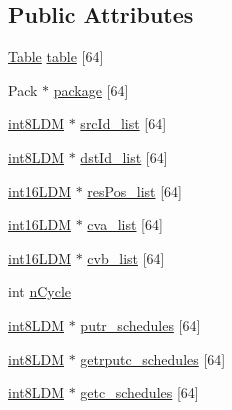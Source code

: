 \subsection*{Public Attributes}
\begin{DoxyCompactItemize}
\item 
\mbox{\hyperlink{structTable}{Table}} \mbox{\hyperlink{structRlmpiInfo_a220265259db4003f306b9a0fbeec5c53}{table}} \mbox{[}64\mbox{]}
\item 
Pack $\ast$ \mbox{\hyperlink{structRlmpiInfo_a6d32f232ba6595d5748ec3a79ea6d1cc}{package}} \mbox{[}64\mbox{]}
\item 
\mbox{\hyperlink{include_2RlmpiShared_8h_a69782ffde89d45e86308f10afedf08a6}{int8\+L\+DM}} $\ast$ \mbox{\hyperlink{structRlmpiInfo_a143fcff092393e2bb5ba597929a76c53}{src\+Id\+\_\+list}} \mbox{[}64\mbox{]}
\item 
\mbox{\hyperlink{include_2RlmpiShared_8h_a69782ffde89d45e86308f10afedf08a6}{int8\+L\+DM}} $\ast$ \mbox{\hyperlink{structRlmpiInfo_ad9c264950416b333c6e8637a379342eb}{dst\+Id\+\_\+list}} \mbox{[}64\mbox{]}
\item 
\mbox{\hyperlink{include_2RlmpiShared_8h_a692aa037341791e306174d4669707b03}{int16\+L\+DM}} $\ast$ \mbox{\hyperlink{structRlmpiInfo_a694bbd8bd51fd61e6c8dacac6967a70b}{res\+Pos\+\_\+list}} \mbox{[}64\mbox{]}
\item 
\mbox{\hyperlink{include_2RlmpiShared_8h_a692aa037341791e306174d4669707b03}{int16\+L\+DM}} $\ast$ \mbox{\hyperlink{structRlmpiInfo_a2d9a408cbf2d67edc38a187347b24782}{cva\+\_\+list}} \mbox{[}64\mbox{]}
\item 
\mbox{\hyperlink{include_2RlmpiShared_8h_a692aa037341791e306174d4669707b03}{int16\+L\+DM}} $\ast$ \mbox{\hyperlink{structRlmpiInfo_abc0947523e956b84bb6706bd3d81d6aa}{cvb\+\_\+list}} \mbox{[}64\mbox{]}
\item 
int \mbox{\hyperlink{structRlmpiInfo_a56620e7b9f13be9c63d0e4a13be12581}{n\+Cycle}}
\item 
\mbox{\hyperlink{include_2RlmpiShared_8h_a69782ffde89d45e86308f10afedf08a6}{int8\+L\+DM}} $\ast$ \mbox{\hyperlink{structRlmpiInfo_afa5313ed3b7fee84d3ba3870f725e5a6}{putr\+\_\+schedules}} \mbox{[}64\mbox{]}
\item 
\mbox{\hyperlink{include_2RlmpiShared_8h_a69782ffde89d45e86308f10afedf08a6}{int8\+L\+DM}} $\ast$ \mbox{\hyperlink{structRlmpiInfo_a97987bae767ddabfd1c39be9fbda8d8a}{getrputc\+\_\+schedules}} \mbox{[}64\mbox{]}
\item 
\mbox{\hyperlink{include_2RlmpiShared_8h_a69782ffde89d45e86308f10afedf08a6}{int8\+L\+DM}} $\ast$ \mbox{\hyperlink{structRlmpiInfo_aa6f288dc8233f10755fa2b255c790719}{getc\+\_\+schedules}} \mbox{[}64\mbox{]}

\end{DoxyCompactItemize}
